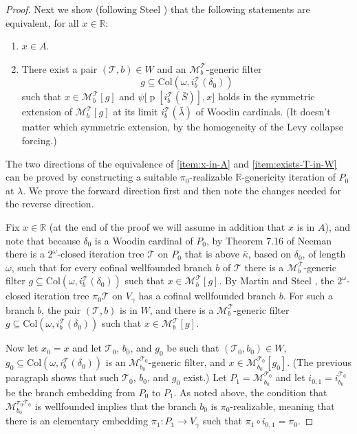 \documentclass[fleqn, 11pt]{amsart}
\theoremstyle{plain}
\theoremstyle{definition}
\theoremstyle{remark}
\newcommand{\bbR}{\mathbb{R}}
\newcommand{\Col}{\mathrm{Col}}
\DeclareMathOperator{\p}{p}
\begin{document}
\begin{proof}
  Next we show (following Steel \cite[Claim 2 on p.~7]{SteSTFree}) that
 the following statements are equivalent, for all $x \in \bbR$:
  \begin{enumerate}
   \item\label{item:x-in-A} $x \in A$.
   \item\label{item:exists-T-in-W}

    There exist a pair $(\mathcal{T},b) \in W$
    and an $\mathcal{M}^\mathcal{T}_b$-generic filter \[g \subseteq \Col(\omega,i^\mathcal{T}_b(\delta_0))\]
    such that 
   $x \in \mathcal{M}^\mathcal{T}_b[g]$ and $\psi\big[\p[i^\mathcal{T}_b(\bar{S})],x\big]$ holds in
   the symmetric extension of $\mathcal{M}^\mathcal{T}_b[g]$ at its limit $i^\mathcal{T}_b(\bar{\lambda})$ of Woodin cardinals. (It doesn't matter which symmetric extension, by the homogeneity of the Levy collapse forcing.)
 \end{enumerate}

The two directions of the equivalence of \eqref{item:x-in-A} and \eqref{item:exists-T-in-W} can be proved by constructing a suitable $\pi_{0}$-realizable $\mathbb{R}$-genericity iteration of $P_{0}$ at $\lambda$. We prove the forward direction first and then note the changes needed for the reverse direction.  

Fix $x \in \mathbb{R}$ (at the end of the proof we will assume in addition that $x$ is in $A$), and note that because $\delta_0$ is a Woodin cardinal of $P_0$,
  by Theorem 7.16 of Neeman \cite{NeeHandbook} there is a $2^\omega$-closed iteration tree
  $\mathcal{T}$ on $P_0$ that is above $\bar{\kappa}$, based on $\delta_0$, of length $\omega$,
  such that for every cofinal wellfounded branch $b$ of $\mathcal{T}$ there is a $\mathcal{M}^\mathcal{T}_b$-generic filter $g \subseteq \Col(\omega,i^\mathcal{T}_b(\delta_0))$ such that 
  $x \in \mathcal{M}^\mathcal{T}_b[g]$.
  By Martin and Steel \cite[Corollary 5.7]{MarSteIterationTrees},
  the $2^\omega$-closed iteration tree $\pi_0\mathcal{T}$ on $V_{\gamma}$
  has a cofinal wellfounded branch $b$.
  For such a branch $b$, the pair $(\mathcal{T},b)$ is in $W$,
  and there is a $\mathcal{M}^\mathcal{T}_b$-generic filter $g \subseteq \Col(\omega,i^\mathcal{T}_b(\delta_0))$ such that 
  $x \in \mathcal{M}^\mathcal{T}_b[g]$.
  

  Now let $x_0 = x$ and let $\mathcal{T}_0$, $b_0$, and $g_0$ be such that $(\mathcal{T}_0,b_0) \in W$, 
  $g_0 \subseteq \Col(\omega,i^\mathcal{T}_b(\delta_0))$ is an $\mathcal{M}^{\mathcal{T}_0}_{b_0}$-generic filter, and
  $x \in \mathcal{M}^{\mathcal{T}_0}_{b_0}[g_0]$. (The previous paragraph shows that such $\mathcal{T}_0$, $b_0$, and $g_0$ exist.)
  Let $P_1 = \mathcal{M}^{\mathcal{T}_0}_{b_0}$ and let $i_{0,1} = i^{\mathcal{T}_{0}}_{b_{0}}$ be the branch embedding from $P_{0}$ to $P_{1}$. 
  As noted above, the condition that $\mathcal{M}_{b_0}^{\pi_0\mathcal{T}_0}$ is wellfounded
  implies that the branch $b_0$ is $\pi_0$-realizable, meaning that there is an elementary embedding $\pi_1 : P_1 \to V_{\gamma}$ such that $\pi_1 \circ i_{0,1} = \pi_0$.
  

\end{proof}
\end{document}

